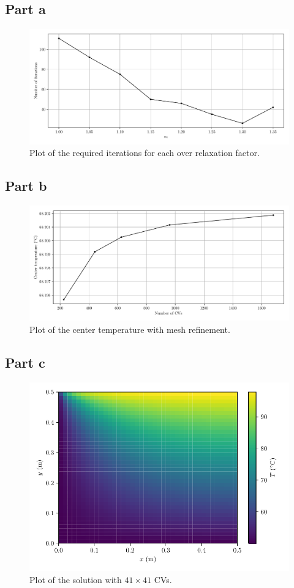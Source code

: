 \documentclass{article}
\begin{document}
\subsection*{Part a}

\begin{figure}[H]
	\centering
	\includegraphics[width=\linewidth]{../python/iterations}
	\caption{Plot of the required iterations for each over relaxation factor.}
	\label{fig:iterations}
\end{figure}

\subsection*{Part b}

\begin{figure}[H]
	\centering
	\includegraphics[width=\linewidth]{../python/center}
	\caption{Plot of the center temperature with mesh refinement.}
	\label{fig:center}
\end{figure}

\subsection*{Part c}

\begin{figure}[H]
	\centering
	\includegraphics[width=0.7\linewidth]{../python/solution}
	\caption{Plot of the solution with $41 \times 41$ CVs.}
	\label{fig:solution}
\end{figure}
\end{document}
